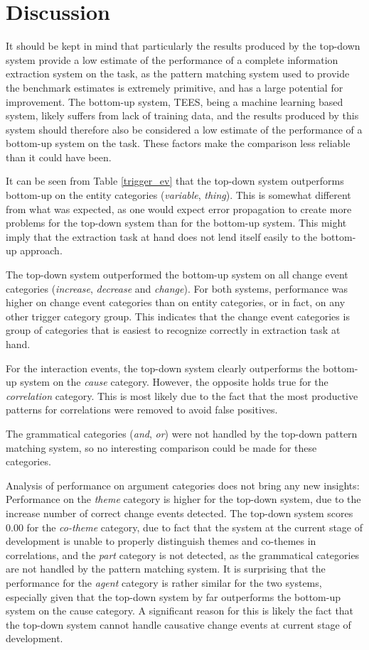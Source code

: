 \section{Discussion}

It should be kept in mind that particularly the results produced by the top-down system provide a low estimate of the performance of a complete information extraction system on the task, as the pattern matching system used to provide the benchmark estimates is extremely primitive, and has a large potential for improvement. The bottom-up system, TEES, being a machine learning based system, likely suffers from lack of training data, and the results produced by this system should therefore also be considered a low estimate of the performance of a bottom-up system on the task. These factors make the comparison less reliable than it could have been.

It can be seen from Table \ref{trigger_ev} that the top-down system outperforms bottom-up on the entity categories (\emph{variable}, \emph{thing}). This is somewhat different from what was expected, as one would expect error propagation to create more problems for the top-down system than for the bottom-up system. This might imply that the extraction task at hand does not lend itself easily to the bottom-up approach. 

The top-down system outperformed the bottom-up system on all change event categories (\emph{increase}, \emph{decrease} and \emph{change}). For both systems, performance was higher on change event categories than on entity categories, or in fact, on any other trigger category group. This indicates that the change event categories is group of categories that is easiest to recognize correctly in extraction task at hand.

For the interaction events, the top-down system clearly outperforms the bottom-up system on the \emph{cause} category.  However, the opposite holds true for the \emph{correlation} category. This is most likely due to the fact that the most productive patterns for correlations were removed to avoid false positives.

The grammatical categories (\emph{and}, \emph{or}) were not handled by the top-down pattern matching system, so no interesting comparison could be made for these categories.

Analysis of performance on argument categories does not bring any new insights: Performance on the \emph{theme} category is higher for the top-down system, due to the increase number of correct change events detected. The top-down system scores 0.00 for the \emph{co-theme} category, due to fact that the system at the current stage of development is unable to properly distinguish themes and co-themes in correlations, and the \emph{part} category is not detected, as the grammatical categories are not handled by the pattern matching system. It is surprising that the performance for the \emph{agent} category is rather similar for the two systems, especially given that the top-down system by far outperforms the bottom-up system on the cause category. A significant reason for this is likely the fact that the top-down system cannot handle causative change events at current stage of development.

